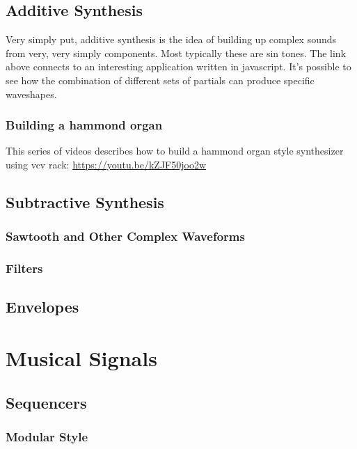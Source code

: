 \documentclass[11pt]{article}
\begin{document}
\subsection{Additive Synthesis}
\label{sec:org19043be}
Very simply put, additive synthesis is the idea of building up complex
sounds from very, very simply components. Most typically these are sin
tones. The link above connects to an interesting application written
in javascript. It's possible to see how the combination of different
sets of partials can produce specific waveshapes. 

\subsubsection{Building a hammond organ}
\label{sec:org42832ee}
This series of videos describes how to build a hammond organ style
synthesizer using vcv rack: \url{https://youtu.be/kZJF50joo2w}



\subsection{Subtractive Synthesis}
\label{sec:orgd9bbdc2}
\subsubsection{Sawtooth and Other Complex Waveforms}
\label{sec:orgd608c48}
\subsubsection{Filters}
\label{sec:orgf45538a}

\subsection{Envelopes}
\label{sec:org63507fa}


\section{Musical Signals}
\label{sec:orge5f6922}
\subsection{Sequencers}
\label{sec:org8431f94}
\subsubsection{Modular Style}
\label{sec:orge186cf4}
\end{document}
